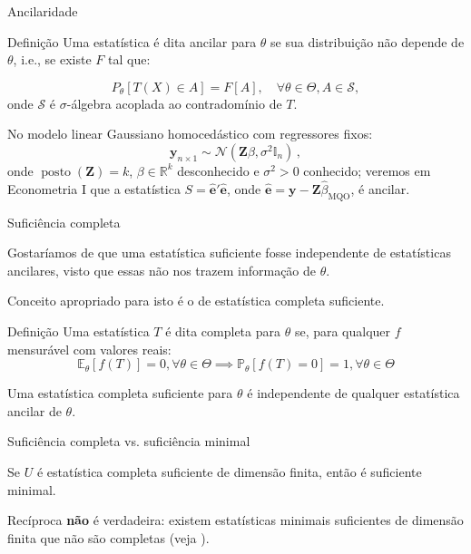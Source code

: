 \documentclass[11pt]{beamer}
\newenvironment{halfwideitemize}{\itemize\addtolength{\itemsep}{0.5em}}{\enditemize}
\begin{document}
	\begin{frame}{Ancilaridade}
		\begin{block}{Definição}
			Uma estatística é dita ancilar para $\theta$ se sua distribuição não depende de $\theta$, i.e., se existe $F$ tal que:
			
			$$P_\theta[T(X) \in A] = F[A], \quad \forall \theta \in \Theta,  A \in \mathcal{S}, $$
			onde $\mathcal{S}$ é $\sigma$-álgebra acoplada ao contradomínio de $T$.
		\end{block}
		\begin{example}
			No modelo linear Gaussiano homocedástico com regressores fixos:
			$$\boldsymbol{y}_{n\times 1} \sim \mathcal{N}(\boldsymbol{Z} \beta, \sigma^2 \mathbb{I}_n) \, ,$$
			onde $\operatorname{posto}(\boldsymbol{Z}) = k$, $\beta \in \mathbb{R}^k$ desconhecido e $\sigma^2 > 0$ conhecido; veremos em Econometria I que a estatística $S = \hat{\boldsymbol{e}}' \hat{\boldsymbol{e}}$, onde $\hat{\boldsymbol{e}} = \boldsymbol{y} - \boldsymbol{Z} \hat{\beta}_{\text{MQO}}$, é ancilar.
		\end{example}
	\end{frame}
	\begin{frame}{Suficiência completa}
		\begin{halfwideitemize}
			\item Gostaríamos de que uma estatística suficiente fosse independente de estatísticas ancilares, visto que essas não nos trazem informação de $\theta$.
			\item Conceito apropriado para isto é o de estatística {\color{blue}completa suficiente}.
			\begin{block}{Definição}
				Uma estatística $T$ é dita completa para $\theta$ se, para qualquer $f$ mensurável com valores reais:
				$$\mathbb{E}_\theta[f(T)] = 0, \forall \theta \in \Theta \implies \mathbb{P}_\theta[f(T) = 0 ] = 1, \forall \theta \in \Theta$$
			\end{block}
			
			\begin{theorem}[Basu]
				Uma estatística {\color{blue}completa suficiente} para  $\theta$ é independente de qualquer estatística ancilar de $\theta$.
			\end{theorem}
			
		\end{halfwideitemize}
		
	\end{frame}
	
	\begin{frame}{Suficiência completa vs. suficiência minimal}
		\begin{theorem}[Bahadur]
			Se $U$ é estatística completa suficiente de dimensão finita, então é suficiente minimal.
		\end{theorem}
		\begin{halfwideitemize}
			\item Recíproca {\color{red}\textbf{não}} é verdadeira: existem estatísticas minimais suficientes de dimensão finita que não são completas (veja \cite{lehmann2006theory}).
		\end{halfwideitemize}
		
	\end{frame}
	
\end{document}
